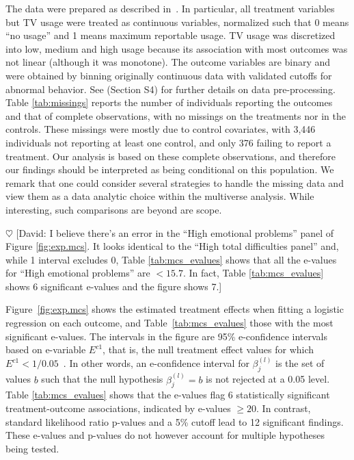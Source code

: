 \documentclass[pdflatex,sn-mathphys-num]{sn-jnl}%
\theoremstyle{thmstyleone}%
\theoremstyle{thmstyletwo}%
\theoremstyle{thmstylethree}%
\newcommand{\david}[1]{{\small{\color{blue} \sf $\heartsuit$ [David: #1]}}}
\begin{document}
The data were prepared as described in~\cite{semken:2022}. In particular, all treatment variables but TV usage were treated as
continuous variables, normalized such that 0 means “no usage” and 1 means maximum
reportable usage. TV usage was discretized into low, medium and high usage because its association with most outcomes was not linear (although it was monotone). The outcome variables are binary and were obtained by binning originally continuous data with validated cutoffs for abnormal behavior. See \cite{semken:2022} (Section S4) for further details on data pre-processing.
\color{blue} Table \ref{tab:missings} reports the number of individuals reporting the outcomes and that of complete observations, with no missings on the treatments nor in the controls. These missings were mostly due to control covariates, with 3,446 individuals not reporting at least one control, and only 376 failing to report a treatment. Our analysis is based on these complete observations, and therefore our findings should be interpreted as being conditional on this population. We remark that one could consider several strategies to handle the missing data and view them as a data analytic choice within the multiverse analysis. While interesting, such comparisons are beyond are scope.  \color{black}

\david{I believe there's an error in the ``High emotional problems'' panel of Figure \ref{fig:exp.mcs}. It looks identical to the ``High total difficulties panel'' and, while 1 interval excludes 0, Table \ref{tab:mcs_evalues} shows that all the e-values for ``High emotional problems'' are $<15.7$. In fact, Table \ref{tab:mcs_evalues} shows 6 significant e-values and the figure shows 7.}

Figure~\ref{fig:exp.mcs} shows the estimated treatment effects when fitting a logistic regression on each outcome,
and Table~\ref{tab:mcs_evalues} those with the most significant e-values.
The intervals in the figure are 95\% e-confidence intervals based on e-variable $E^{c1}$, that is, the null treatment effect values for which $E^{c1}<1/0.05$~\cite{ramdas:2025}. In other words, an e-confidence interval for $\beta_j^{(l)}$ is the set of values $b$ such that the null hypothesis $\beta_j^{(l)}=b$ is not rejected at a 0.05 level. %
Table \ref{tab:mcs_evalues} shows that the e-values flag 6 statistically significant treatment-outcome associations, indicated by e-values $\geq 20$. In contrast, standard likelihood ratio p-values and a 5\% cutoff lead to 12 significant findings. 
These e-values and p-values do not however account for multiple hypotheses being tested.
\end{document}
